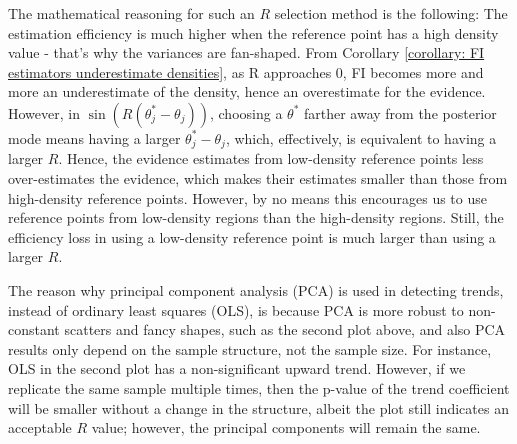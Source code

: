 \documentclass[%
 reprint,
 amsmath,amssymb,
 aps,
]{revtex4-2}
\begin{document}
The mathematical reasoning for such an $R$ selection method is the following: The estimation efficiency is much higher when the reference point has a high density value - that's why the variances are fan-shaped.
From Corollary \ref{corollary: FI estimators underestimate densities}, as R approaches 0, FI becomes more and more an underestimate of the density, hence an overestimate for the evidence. However, in $\sin(R(\theta_j^* - \theta_j))$, choosing a $\theta^*$ farther away from the posterior mode means having a larger $\theta_j^* - \theta_j$, which, effectively, is equivalent to having a larger $R$. Hence, the evidence estimates from low-density reference points less over-estimates the evidence, which makes their estimates smaller than those from high-density reference points. However, by no means this encourages us to use reference points from low-density regions than the high-density regions. Still, the efficiency loss in using a low-density reference point is much larger than using a larger $R$.

The reason why principal component analysis (PCA) is used in detecting trends, instead of ordinary least squares (OLS), is because PCA is more robust to non-constant scatters and fancy shapes, such as the second plot above, and also PCA results only depend on the sample structure, not the sample size. For instance, OLS in the second plot has a non-significant upward trend. However, if we replicate the same sample multiple times, then the p-value of the trend coefficient will be smaller without a change in the structure, albeit the plot still indicates an acceptable $R$ value; however, the principal components will remain the same. 

\end{document}

